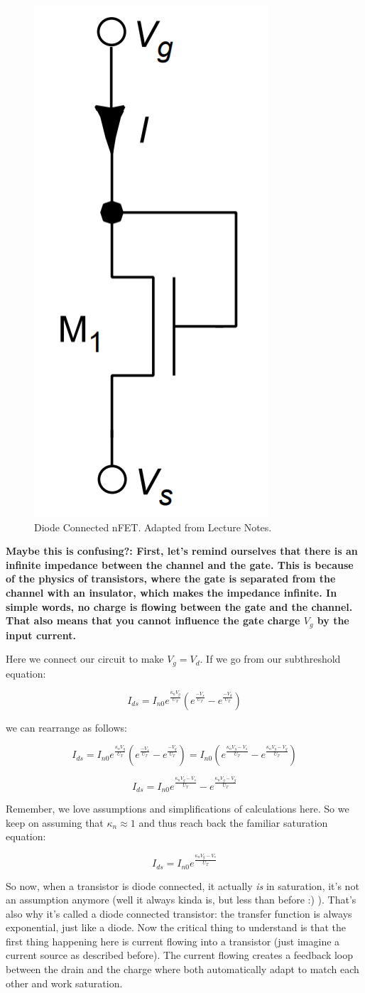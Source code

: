 \begin{figure}[H]
    \centering
    \includegraphics[width=0.15\linewidth]{../../Figures/Diode_Connected_NFET.PNG}
    \caption{Diode Connected nFET. Adapted from Lecture Notes.}
    \label{fig:basalandcerebellum}
\end{figure}

\textbf{Maybe this is confusing?: First, let's remind ourselves that there is an infinite impedance between the channel and the gate. This is because of the physics of transistors, where the gate is separated from the channel with an insulator, which makes the impedance infinite. In simple words, no charge is flowing between the gate and the channel. That also means that you cannot influence the gate charge $V_g$ by the input current.}

Here we connect our circuit to make $V_g = V_d$. If we go from our subthreshold equation:

\begin{equation}
I_{ds} = I_{n0} e^{\frac{\kappa_{n}V_g}{U_T}}(e^\frac{-V_s}{U_T} - e^\frac{-V_d}{U_T})
\end{equation} 

we can rearrange as follows: 

\begin{equation}
I_{ds} = I_{n0} e^{\frac{\kappa_{n}V_g}{U_T}}(e^\frac{-V_s}{U_T} - e^\frac{-V_g}{U_T}) = I_{n0} (e^{\frac{\kappa_{n}V_g - V_s}{U_T}} - e^\frac{\kappa_{n}V_g - V_g}{U_T})
\end{equation}

\begin{equation}
I_{ds} = I_{n0} e^{\frac{\kappa_{n}V_g - V_s}{U_T}} - e^\frac{\kappa_{n}V_g - V_g}{U_T}
\end{equation}

Remember, we love assumptions and simplifications of calculations here. So we keep on assuming that $\kappa_n \approx 1$ and thus reach back the familiar saturation equation:

\begin{equation}
I_{ds} = I_{n0} e^{\frac{\kappa_{n}V_g - V_s}{U_T}}
\end{equation}

So now, when a transistor is diode connected, it actually \emph{is} in saturation, it's not an assumption anymore (well it always kinda is, but less than before :) ). That's also why it's called a diode connected transistor: the transfer function is always exponential, just like a diode. Now the critical thing to understand is that the first thing happening here is current flowing into a transistor (just imagine a current source as described before). The current flowing creates a feedback loop between the drain and the charge where both automatically adapt to match each other and work saturation.
